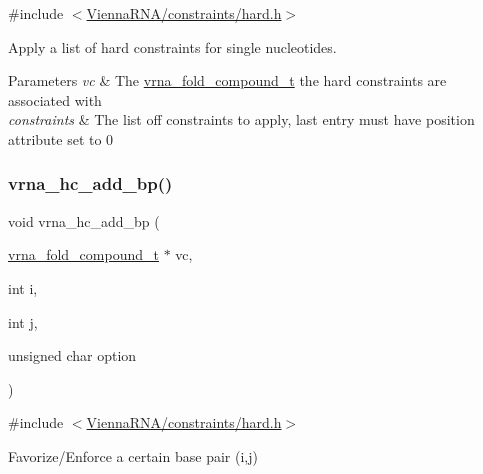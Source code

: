 {\ttfamily \#include $<$\mbox{\hyperlink{hard_8h}{Vienna\+R\+N\+A/constraints/hard.\+h}}$>$}



Apply a list of hard constraints for single nucleotides. 


\begin{DoxyParams}{Parameters}
{\em vc} & The \mbox{\hyperlink{group__fold__compound_ga1b0cef17fd40466cef5968eaeeff6166}{vrna\+\_\+fold\+\_\+compound\+\_\+t}} the hard constraints are associated with \\
\hline
{\em constraints} & The list off constraints to apply, last entry must have position attribute set to 0 \\
\hline
\end{DoxyParams}
\mbox{\label{group__hard__constraints_ga7cba95ebe2ceb5ec9a5768f2232854fd}} 
\subsubsection{\texorpdfstring{vrna\_hc\_add\_bp()}{vrna\_hc\_add\_bp()}}
{\footnotesize\ttfamily void vrna\+\_\+hc\+\_\+add\+\_\+bp (\begin{DoxyParamCaption}\item[{\mbox{\hyperlink{group__fold__compound_ga1b0cef17fd40466cef5968eaeeff6166}{vrna\+\_\+fold\+\_\+compound\+\_\+t}} $\ast$}]{vc,  }\item[{int}]{i,  }\item[{int}]{j,  }\item[{unsigned char}]{option }\end{DoxyParamCaption})}



{\ttfamily \#include $<$\mbox{\hyperlink{hard_8h}{Vienna\+R\+N\+A/constraints/hard.\+h}}$>$}



Favorize/\+Enforce a certain base pair (i,j) 

